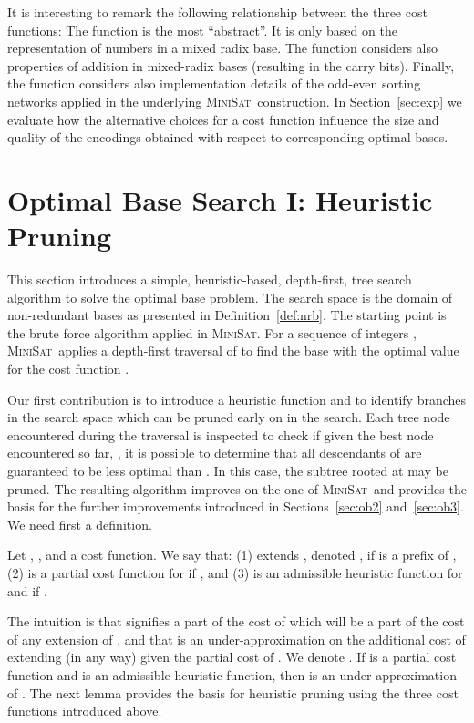 \documentclass[envcountsame]{llncs}
\newcommand\minisatp{\textsc{MiniSat}}
\begin{document}
It is interesting to remark the following relationship between the
three cost functions: The  function is the most
``abstract''. It is only based on the representation of numbers in a
mixed radix base.
The  function considers also properties of addition
in mixed-radix bases (resulting in the carry bits).
Finally, the  function considers also implementation
details of the odd-even sorting networks applied in the underlying
\minisatp\ construction.
In Section~\ref{sec:exp} we evaluate how the alternative choices for a
cost function influence the size and quality of the encodings obtained
with respect to corresponding optimal bases.




\section{Optimal Base Search I: Heuristic Pruning}
\label{sec:ob1}

This section introduces a simple, heuristic-based, depth-first, tree
search algorithm to solve the optimal base problem. The search space
is the domain of non-redundant bases as presented in
Definition~\ref{def:nrb}.
The starting point is the brute force algorithm applied in \minisatp.
For a sequence of integers , \minisatp\ applies a depth-first
traversal of  to find the base with the optimal value
for the cost function .

Our first contribution is to introduce a heuristic function and to identify
branches in the search space which can be pruned early on in the
search. Each tree node  encountered during the traversal is
inspected to check if given the best node encountered so far, ,
it is possible to determine that all descendants of  are guaranteed
to be less optimal than . In this case, the subtree rooted at
 may be pruned.
The resulting algorithm improves on the one of \minisatp\ and
provides the basis for the further improvements introduced in
Sections~\ref{sec:ob2} and~\ref{sec:ob3}.
We need first a definition.

\begin{definition}
  Let , , and  a cost
  function. We say that: 
(1)  extends , denoted , if  is a prefix of
  , 
(2)  is a partial cost function for  if
  , and
(3)  is an admissible heuristic function for  and
   if .
\end{definition}
The intuition is that  signifies a part of the
cost of  which will be a part of the cost of any extension of ,
and that  is an under-approximation on the additional cost of
extending  (in any way) given the partial cost of .
We denote . If
 is a partial cost function and  is an
admissible heuristic function, then  is an
under-approximation of .
The next lemma provides the basis for heuristic pruning using the
three cost functions introduced above.
\end{document}
